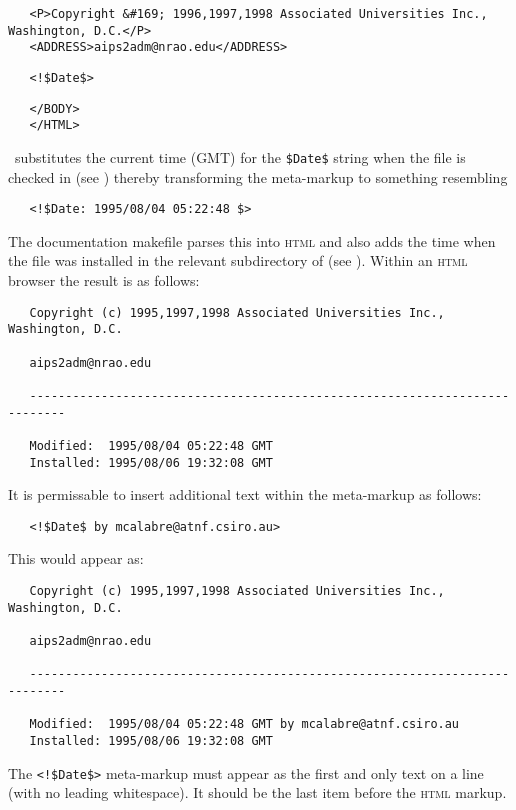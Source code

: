 \begin{verbatim}
   <P>Copyright &#169; 1996,1997,1998 Associated Universities Inc., Washington, D.C.</P>
   <ADDRESS>aips2adm@nrao.edu</ADDRESS>
\end{verbatim}

\noindent
\verb+   <!$+\verb+Date$>+

\begin{verbatim}
   </BODY>
   </HTML>
\end{verbatim}

\noindent
\rcs\ substitutes the current time (GMT) for the \verb+$+\verb+Date$+ string
when the file is checked in (see ) thereby transforming the
meta-markup to something resembling

\noindent
\verb+   <!$+\verb+Date: 1995/08/04 05:22:48 $>+

\noindent
The documentation makefile parses this into \textsc{html} and also adds the
time when the  file was installed in the relevant subdirectory of
 (see ).  Within an \textsc{html} browser the
result is as follows:

\begin{verbatim}
   Copyright (c) 1995,1997,1998 Associated Universities Inc., Washington, D.C.

   aips2adm@nrao.edu

   ---------------------------------------------------------------------------

   Modified:  1995/08/04 05:22:48 GMT
   Installed: 1995/08/06 19:32:08 GMT
\end{verbatim}

\noindent
It is permissable to insert additional text within the meta-markup as follows:

\noindent
\verb+   <!$+\verb+Date$ by mcalabre@atnf.csiro.au>+

\noindent
This would appear as:

\begin{verbatim}
   Copyright (c) 1995,1997,1998 Associated Universities Inc., Washington, D.C.

   aips2adm@nrao.edu

   ---------------------------------------------------------------------------

   Modified:  1995/08/04 05:22:48 GMT by mcalabre@atnf.csiro.au
   Installed: 1995/08/06 19:32:08 GMT
\end{verbatim}

\noindent
The \verb+<!$+\verb+Date$>+ meta-markup must appear as the first and only text
on a line (with no leading whitespace).  It should be the last item before the
 \textsc{html} markup.

